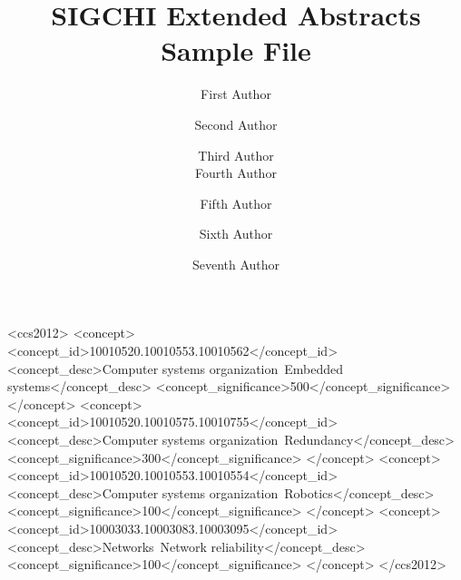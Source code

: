 \documentclass[sigchi-a, authorversion]{acmart}
\begin{document}
\title{SIGCHI Extended Abstracts Sample File}

\author{First Author}

\author{Second Author}
 
\author{Third Author \\
  Fourth Author}

\author{Fifth Author}

\author{Sixth Author}

\author{Seventh Author}

\renewcommand{\shortauthors}{F. Author et al.}


%
%
\begin{CCSXML}
<ccs2012>
 <concept>
  <concept_id>10010520.10010553.10010562</concept_id>
  <concept_desc>Computer systems organization~Embedded systems</concept_desc>
  <concept_significance>500</concept_significance>
 </concept>
 <concept>
  <concept_id>10010520.10010575.10010755</concept_id>
  <concept_desc>Computer systems organization~Redundancy</concept_desc>
  <concept_significance>300</concept_significance>
 </concept>
 <concept>
  <concept_id>10010520.10010553.10010554</concept_id>
  <concept_desc>Computer systems organization~Robotics</concept_desc>
  <concept_significance>100</concept_significance>
 </concept>
 <concept>
  <concept_id>10003033.10003083.10003095</concept_id>
  <concept_desc>Networks~Network reliability</concept_desc>
  <concept_significance>100</concept_significance>
 </concept>
</ccs2012>
\end{CCSXML}
\end{document}
